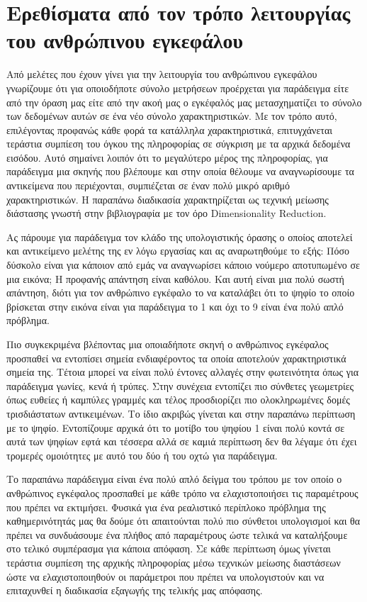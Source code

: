 \section{Ερεθίσματα από τον τρόπο λειτουργίας του ανθρώπινου εγκεφάλου}
\par
Από μελέτες που έχουν γίνει για την λειτουργία του ανθρώπινου εγκεφάλου γνωρίζουμε ότι για οποιοδήποτε σύνολο μετρήσεων προέρχεται για παράδειγμα είτε από την όραση μας είτε από την ακοή μας ο εγκέφαλός μας μετασχηματίζει το σύνολο των δεδομένων αυτών σε ένα νέο σύνολο χαρακτηριστικών. Με τον τρόπο αυτό, επιλέγοντας προφανώς κάθε φορά τα κατάλληλα χαρακτηριστικά, επιτυγχάνεται τεράστια συμπίεση του όγκου της πληροφορίας σε σύγκριση με τα αρχικά δεδομένα εισόδου. Αυτό σημαίνει λοιπόν ότι το μεγαλύτερο μέρος της πληροφορίας, για παράδειγμα μια σκηνής που βλέπουμε και στην οποία θέλουμε να αναγνωρίσουμε τα αντικείμενα που περιέχονται, συμπιέζεται σε έναν πολύ μικρό αριθμό χαρακτηριστικών. Η παραπάνω διαδικασία χαρακτηρίζεται ως τεχνική μείωσης διάστασης γνωστή στην βιβλιογραφία με τον όρο \textlatin{Dimensionality Reduction}.
\par
Ας πάρουμε για παράδειγμα τον κλάδο της υπολογιστικής όρασης ο οποίος αποτελεί και αντικείμενο μελέτης της εν λόγω εργασίας και ας αναρωτηθούμε το εξής: Πόσο δύσκολο είναι για κάποιον από εμάς να αναγνωρίσει κάποιο νούμερο αποτυπωμένο σε μια εικόνα; Η προφανής απάντηση είναι καθόλου. Και αυτή είναι μια πολύ σωστή απάντηση, διότι για τον ανθρώπινο εγκέφαλο το να καταλάβει ότι το ψηφίο το οποίο βρίσκεται στην εικόνα είναι για παράδειγμα το 1 και όχι το 9 είναι ένα πολύ απλό πρόβλημα. 
\par
Πιο συγκεκριμένα βλέποντας μια οποιαδήποτε σκηνή ο ανθρώπινος εγκέφαλος προσπαθεί να εντοπίσει σημεία ενδιαφέροντος τα οποία αποτελούν χαρακτηριστικά σημεία της. Τέτοια μπορεί να είναι πολύ έντονες αλλαγές στην φωτεινότητα όπως για παράδειγμα γωνίες, κενά ή τρύπες. Στην συνέχεια εντοπίζει πιο σύνθετες γεωμετρίες όπως ευθείες ή καμπύλες γραμμές και τέλος προσδιορίζει πιο ολοκληρωμένες δομές τρισδιάστατων αντικειμένων. Το ίδιο ακριβώς γίνεται και στην παραπάνω περίπτωση με το ψηφίο. Εντοπίζουμε αρχικά ότι το μοτίβο του ψηφίου 1 είναι πολύ κοντά σε αυτά των ψηφίων εφτά και τέσσερα αλλά σε καμιά περίπτωση δεν θα λέγαμε ότι έχει τρομερές ομοιότητες με αυτό του δύο ή του οχτώ για παράδειγμα. 
\par
Το παραπάνω παράδειγμα είναι ένα πολύ απλό δείγμα του τρόπου με τον οποίο ο ανθρώπινος εγκέφαλος προσπαθεί με κάθε τρόπο να ελαχιστοποιήσει τις παραμέτρους που πρέπει να εκτιμήσει. Φυσικά για ένα ρεαλιστικό περίπλοκο πρόβλημα της καθημερινότητάς μας θα δούμε ότι απαιτούνται πολύ πιο σύνθετοι υπολογισμοί και θα πρέπει να συνδυάσουμε ένα πλήθος από παραμέτρους ώστε τελικά να καταλήξουμε στο τελικό συμπέρασμα για κάποια απόφαση. Σε κάθε περίπτωση όμως γίνεται τεράστια συμπίεση της αρχικής πληροφορίας μέσω τεχνικών μείωσης διαστάσεων ώστε να ελαχιστοποιηθούν οι παράμετροι που πρέπει να υπολογιστούν και να επιταχυνθεί η διαδικασία εξαγωγής της τελικής μας απόφασης.
